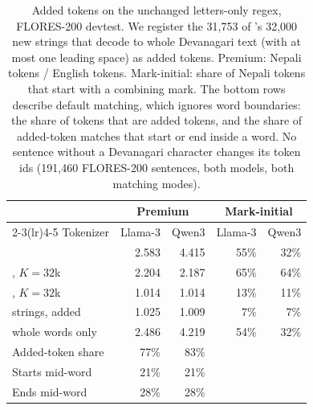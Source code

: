 \begin{table}[!htb]
\centering\small
\setlength{\tabcolsep}{3pt}
\begin{tabular}{lrrrr}
\toprule
 & \multicolumn{2}{c}{Premium} & \multicolumn{2}{c}{Mark-initial} \\
\cmidrule(lr){2-3}\cmidrule(lr){4-5}
Tokenizer & Llama-3 & Qwen3 & Llama-3 & Qwen3 \\
\midrule
\RO{} & 2.583 & 4.415 & 55\% & 32\% \\
\RI{}, $K{=}32$k & 2.204 & 2.187 & 65\% & 64\% \\
\RII{}, $K{=}32$k & 1.014 & 1.014 & 13\% & 11\% \\
\RII{} strings, added & 1.025 & 1.009 & 7\% & 7\% \\
\quad whole words only & 2.486 & 4.219 & 54\% & 32\% \\
\midrule
Added-token share & 77\% & 83\% & & \\
Starts mid-word & 21\% & 21\% & & \\
Ends mid-word & 28\% & 28\% & & \\
\bottomrule
\end{tabular}
\caption{Added tokens on the unchanged letters-only regex, FLORES-200 devtest. We register the 31{,}753 of \RII{}'s 32{,}000 new strings that decode to whole Devanagari text (with at most one leading space) as added tokens. Premium: Nepali tokens / English tokens. Mark-initial: share of Nepali tokens that start with a combining mark. The bottom rows describe default matching, which ignores word boundaries: the share of tokens that are added tokens, and the share of added-token matches that start or end inside a word. No sentence without a Devanagari character changes its token ids (191{,}460 FLORES-200 sentences, both models, both matching modes).}
\label{tab:added}
\end{table}
